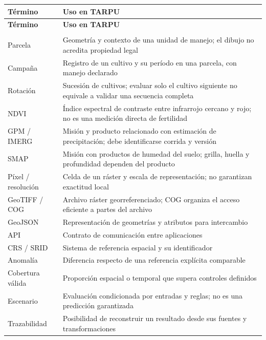 \documentclass[10pt,a4paper]{article}
\begin{document}
\begingroup\small
\begin{longtable}{>{\raggedright\arraybackslash}p{4.841cm}>{\raggedright\arraybackslash}p{11.296cm}}
\toprule
\textbf{Término} & \textbf{Uso en TARPU} \\
\midrule\endfirsthead
\toprule
\textbf{Término} & \textbf{Uso en TARPU} \\
\midrule\endhead
\midrule\multicolumn{2}{r}{\scriptsize Continúa en la página siguiente}\\\endfoot
\bottomrule\endlastfoot
Parcela & Geometría y contexto de una unidad de manejo; el dibujo no acredita propiedad legal \\[3pt]
Campaña & Registro de un cultivo y su período en una parcela, con manejo declarado \\[3pt]
Rotación & Sucesión de cultivos; evaluar solo el cultivo siguiente no equivale a validar una secuencia completa \\[3pt]
NDVI & Índice espectral de contraste entre infrarrojo cercano y rojo; no es una medición directa de fertilidad \\[3pt]
GPM /\allowbreak{} IMERG & Misión y producto relacionado con estimación de precipitación; debe identificarse corrida y versión \\[3pt]
SMAP & Misión con productos de humedad del suelo; grilla, huella y profundidad dependen del producto \\[3pt]
Píxel /\allowbreak{} resolución & Celda de un ráster y escala de representación; no garantizan exactitud local \\[3pt]
GeoTIFF /\allowbreak{} COG & Archivo ráster georreferenciado; COG organiza el acceso eficiente a partes del archivo \\[3pt]
GeoJSON & Representación de geometrías y atributos para intercambio \\[3pt]
API & Contrato de comunicación entre aplicaciones \\[3pt]
CRS /\allowbreak{} SRID & Sistema de referencia espacial y su identificador \\[3pt]
Anomalía & Diferencia respecto de una referencia explícita comparable \\[3pt]
Cobertura válida & Proporción espacial o temporal que supera controles definidos \\[3pt]
Escenario & Evaluación condicionada por entradas y reglas; no es una predicción garantizada \\[3pt]
Trazabilidad & Posibilidad de reconstruir un resultado desde sus fuentes y transformaciones \\[3pt]
\end{longtable}
\endgroup
\end{document}
